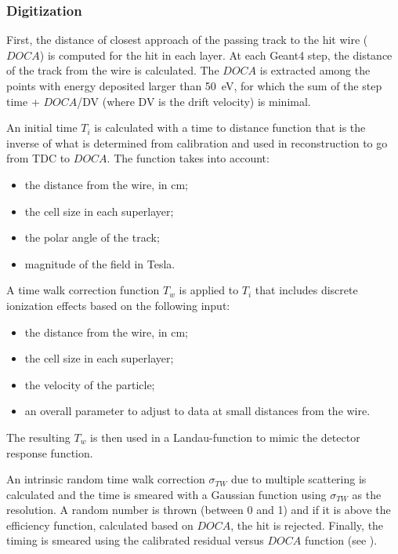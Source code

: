 \subsubsection{Digitization}

First, the distance of closest approach of the passing track to the hit wire ($DOCA$) is computed for the hit in each layer.
At each Geant4 step, the distance of the track from the wire is calculated.
The $DOCA$ is extracted among the points with energy deposited larger than 50~eV,
for which the sum of the step time + $DOCA$/DV (where DV is the drift velocity) is minimal.

An initial time $T_i$ is calculated with a time to distance function that is the inverse of
what is determined from calibration and used in reconstruction to go from TDC to $DOCA$.
The function takes into account:

\begin{itemize}
	\item the distance from the wire, in cm;
	\item the cell size in each superlayer;
	\item the polar angle of the track;
	\item magnitude of the field in Tesla.
\end{itemize}

A time walk correction function $T_w$ is applied to $T_i$ that includes discrete ionization effects based on the following input:

\begin{itemize}
	\item the distance from the wire, in cm;
	\item the cell size in each superlayer;
	\item the velocity of the particle;
	\item an overall parameter to adjust to data at small distances from the wire.
\end{itemize}

\noindent The resulting $T_w$ is then used in a Landau-function to mimic the detector response function.

An intrinsic random time walk correction $\sigma_{TW}$ due to multiple scattering is calculated and the time is smeared with
a Gaussian function using $\sigma_{TW}$ as the resolution.
A random number is thrown (between 0 and 1) and if it is above the efficiency function, calculated based on $DOCA$, the hit is rejected.
Finally, the timing is smeared using the calibrated residual versus $DOCA$ function (see ).

